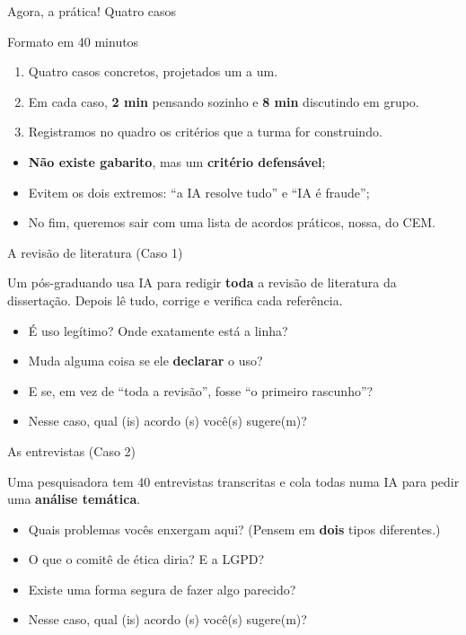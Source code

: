 \documentclass[11pt,aspectratio=169,t]{beamer}
\begin{document}
\begin{frame}{Agora, a prática! Quatro casos}
  \small
  \begin{block}{Formato em 40 minutos}
    \begin{enumerate}
      \item Quatro casos concretos, projetados um a um.
      \item Em cada caso, \textbf{2 min} pensando sozinho e \textbf{8 min} discutindo em grupo.
      \item Registramos no quadro os critérios que a turma for construindo.
    \end{enumerate}
  \end{block}
  \pause
  \vspace{0.2cm}
  \begin{itemize}
    \item \textbf{Não existe gabarito}, mas um \textbf{critério defensável};
    \item Evitem os dois extremos: ``a IA resolve tudo'' e ``IA é fraude'';
    \pause
    \item \alert{No fim, queremos sair com uma lista de acordos práticos, nossa, do CEM.}
  \end{itemize}
\end{frame}
\begin{frame}{A revisão de literatura (Caso 1)}
  \begin{alertblock}{}
    \centering\large
    Um pós-graduando usa IA para redigir \textbf{toda} a revisão de literatura da dissertação. Depois lê tudo, corrige e verifica cada referência.
  \end{alertblock}
  \vfill
  \begin{itemize}
    \item É uso legítimo? Onde exatamente está a linha?
    \item Muda alguma coisa se ele \textbf{declarar} o uso?
    \item E se, em vez de ``toda a revisão'', fosse ``o primeiro rascunho''?
     \item Nesse caso, qual (is) acordo (s) você(s) sugere(m)?
  \end{itemize}
\end{frame}
\begin{frame}{As entrevistas (Caso 2)}
  \begin{alertblock}{}
    \centering\large
    Uma pesquisadora tem 40 entrevistas transcritas e cola todas numa IA para pedir uma \textbf{análise temática}.
  \end{alertblock}
  \vfill
  \begin{itemize}
    \item Quais problemas vocês enxergam aqui? (Pensem em \textbf{dois} tipos diferentes.)
    \item O que o comitê de ética diria? E a LGPD?
    \item Existe uma forma segura de fazer algo parecido?
         \item Nesse caso, qual (is) acordo (s) você(s) sugere(m)?
  \end{itemize}
\end{frame}
\end{document}
